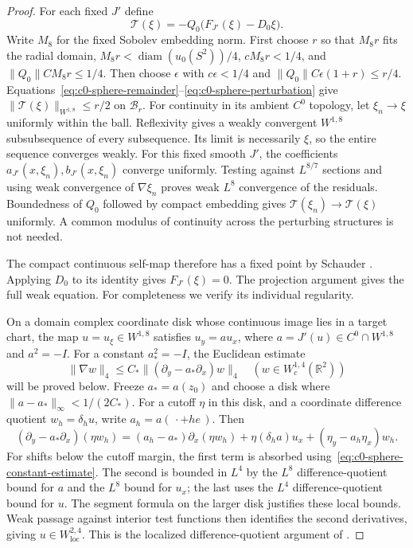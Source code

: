 \documentclass[11pt]{article}
\numberwithin{equation}{section}
\theoremstyle{definition}
\theoremstyle{remark}
\newcommand{\R}{\mathbb R}
\begin{document}
\begin{proof}
For each fixed $J'$ define
\[
 \mathcal T(\xi)=-Q_0\bigl(F_{J'}(\xi)-D_0\xi\bigr).
\]
Write $M_8$ for the fixed Sobolev embedding norm. First choose
$r$ so that $M_8r$ fits the radial domain,
$M_8r<\operatorname{diam}(u_0(S^2))/4$,
$cM_8r<1/4$, and $\|Q_0\|CM_8r\le1/4$.
Then choose $\epsilon$ with $c\epsilon<1/4$ and
$\|Q_0\|C\epsilon(1+r)\le r/4$.
Equations~\eqref{eq:c0-sphere-remainder}--\eqref{eq:c0-sphere-perturbation}
give $\|\mathcal T(\xi)\|_{W^{1,8}}\le r/2$ on $\mathcal B_r$.
For continuity in its ambient $C^0$ topology, let
$\xi_n\to\xi$ uniformly within the ball. Reflexivity gives a
weakly convergent $W^{1,8}$ subsubsequence of every subsequence.
Its limit is necessarily $\xi$, so the entire sequence converges
weakly. For this fixed smooth $J'$, the coefficients
$a_{J'}(x,\xi_n),b_{J'}(x,\xi_n)$ converge uniformly. Testing
against $L^{8/7}$ sections and using weak convergence of
$\nabla\xi_n$ proves weak $L^8$ convergence of the residuals.
Boundedness of $Q_0$ followed by compact embedding gives
$\mathcal T(\xi_n)\to\mathcal T(\xi)$ uniformly.
A common modulus of continuity across the perturbing structures
is not needed.

The compact continuous self-map therefore has a fixed point
by Schauder
\cite[Definition~1.11 in \S1.6, and Theorem~1.17,
pp.~18, 23--24]{Laugesen2020LinearAnalysis}.
Applying $D_0$ to its identity gives $F_{J'}(\xi)=0$.
The projection argument gives the full weak equation.
For completeness we verify its individual regularity.

On a domain complex coordinate disk whose continuous image
lies in a target chart, the map $u=u_\xi\in W^{1,8}$ satisfies
$u_y=a u_x$, where $a=J'(u)\in C^0\cap W^{1,8}$ and $a^2=-I$.
For a constant $a_*^2=-I$, the Euclidean estimate
\begin{equation}\label{eq:c0-sphere-constant-estimate}
 \|\nabla w\|_4\le C_*\|(\partial_y-a_*\partial_x)w\|_4
 \quad(w\in W^{1,4}_c(\R^2))
\end{equation}
will be proved below. Freeze $a_*=a(z_0)$ and choose a disk
where $\|a-a_*\|_\infty<1/(2C_*)$. For a cutoff $\eta$ in
this disk, and a coordinate difference quotient $w_h=\delta_hu$,
write $a_h=a(\,\cdot+he\,)$. Then
\[
 (\partial_y-a_*\partial_x)(\eta w_h)
 =(a_h-a_*)\partial_x(\eta w_h)
   +\eta(\delta_ha)u_x+(\eta_y-a_h\eta_x)w_h.
\]
For shifts below the cutoff margin, the first term is absorbed
using~\eqref{eq:c0-sphere-constant-estimate}. The second is bounded
in $L^4$ by the $L^8$ difference-quotient bound for $a$ and
the $L^8$ bound for $u_x$; the last uses the $L^4$
difference-quotient bound for $u$. The segment formula on
the larger disk justifies these local bounds. Weak passage
against interior test functions then identifies the second
derivatives, giving $u\in W^{2,4}_{\mathrm{loc}}$.
This is the localized difference-quotient argument of
\cite[Proposition~5.7, pp.~110--111]{Laugesen2020LinearAnalysis}.


\end{proof}
\end{document}
